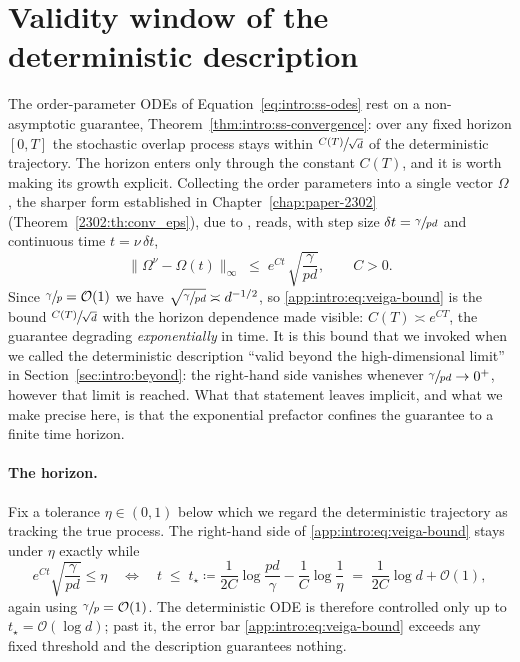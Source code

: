 \section{Validity window of the deterministic description}
\label{app:intro:validity-window}

The order-parameter ODEs of Equation~\eqref{eq:intro:ss-odes} rest on a
non-asymptotic guarantee, Theorem~\ref{thm:intro:ss-convergence}: over any fixed
horizon \([0, T]\) the stochastic overlap process stays within
\(\sfrac{C(T)}{\sqrt{d}}\) of the deterministic trajectory. The horizon enters
only through the constant \(C(T)\), and it is worth making its growth explicit.
Collecting the order parameters into a single vector \(\Omega\), the sharper form
established in Chapter~\ref{chap:paper-2302} (Theorem~\ref{2302:th:conv_eps}), due
to \citet{veiga2022phase}, reads, with step size \(\delta t = \sfrac{\gamma}{pd}\)
and continuous time \(t = \nu\,\delta t\),
\begin{equation} \label{app:intro:eq:veiga-bound}
    \lVert \Omega^{\nu} - \Omega(t) \rVert_\infty
    \;\leq\; e^{C t}\,\sqrt{\frac{\gamma}{pd}}, \qquad C > 0 .
\end{equation}
Since \(\sfrac{\gamma}{p} = \mathcal{O}(1)\) we have \(\sqrt{\sfrac{\gamma}{pd}}
\asymp d^{-1/2}\), so \eqref{app:intro:eq:veiga-bound} is the bound
\(\sfrac{C(T)}{\sqrt{d}}\) with the horizon dependence made visible:
\(C(T) \asymp e^{CT}\), the guarantee degrading \emph{exponentially} in time. It is
this bound that we invoked when we called the deterministic description ``valid
beyond the high-dimensional limit'' in Section~\ref{sec:intro:beyond}: the
right-hand side vanishes whenever \(\sfrac{\gamma}{pd}\to 0^{+}\), however that
limit is reached. What that statement leaves implicit, and what we make precise
here, is that the exponential prefactor confines the guarantee to a finite time
horizon.

\paragraph{The horizon.}
Fix a tolerance \(\eta \in (0,1)\) below which we regard the deterministic
trajectory as tracking the true process. The right-hand side of
\eqref{app:intro:eq:veiga-bound} stays under \(\eta\) exactly while
\begin{equation} \label{app:intro:eq:window}
    e^{Ct}\sqrt{\frac{\gamma}{pd}} \leq \eta
    \quad\Longleftrightarrow\quad
    t \;\leq\; t_\star \coloneqq \frac{1}{2C}\log\frac{pd}{\gamma}
        - \frac{1}{C}\log\frac{1}{\eta}
    \;=\; \frac{1}{2C}\log d + \mathcal{O}(1),
\end{equation}
again using \(\sfrac{\gamma}{p} = \mathcal{O}(1)\). The deterministic ODE is
therefore controlled only up to \(t_\star = \mathcal{O}(\log d)\); past it, the
error bar \eqref{app:intro:eq:veiga-bound} exceeds any fixed threshold and the
description guarantees nothing.


